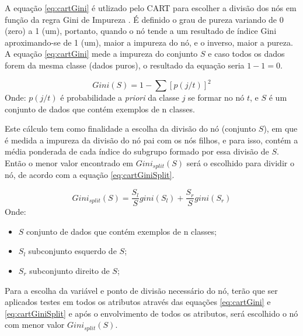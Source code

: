 A equação \ref{eq:cartGini} é utlizado pelo CART para escolher a divisão dos nós em função da regra Gini de Impureza \cite{breiman1984}. É definido o grau de pureza variando de 0 (zero) a 1 (um), portanto, quando o nó tende a um resultado de índice Gini aproximando-se de 1 (um), maior a impureza do nó, e o inverso, maior a pureza. A equação \ref{eq:cartGini} mede a impureza do conjunto ${S}$ e caso todos os dados forem da mesma classe (dados puros), o resultado da equação seria ${1-1=0}$.

\begin{equation}
Gini(S)= 1 - \sum [p(j/t)]^2
 \label{eq:cartGini}
\end{equation}
Onde: ${p(j/t)}$ é probabilidade a \textit{priori} da classe ${j}$ se formar no nó ${t}$, e ${S}$ é um conjunto de dados que contém exemplos de n classes.
 

Este cálculo tem como finalidade a escolha da divisão do nó (conjunto ${S}$), em que é medida a impureza da divisão do nó pai com os nós filhos, e para isso, contém a média ponderada de cada índice do subgrupo formado por essa divisão de ${S}$. Então o menor valor encontrado em ${Gini_{split}(S)}$ será o escolhido para dividir o nó, de acordo com a equação \ref{eq:cartGiniSplit}.

\begin{equation}
Gini_{split}(S) = \frac{S_l}{S}gini(S_l)+\frac{S_r}{S}gini(S_r)
 \label{eq:cartGiniSplit}
\end{equation}
Onde:
\begin{itemize}[noitemsep]
            \item ${S}$ conjunto de dados que contém exemplos de n classes;
            \item ${S_l}$ subconjunto esquerdo de ${S}$;
            \item ${S_r}$ subconjunto direito de ${S}$;
        \end{itemize}

Para a escolha da variável e ponto de divisão necessário do nó, terão que ser aplicados testes em todos os atributos através das equações \ref{eq:cartGini} e \ref{eq:cartGiniSplit} e após o envolvimento de todos os atributos, será escolhido o nó com menor valor ${Gini_{split}(S)}$.


